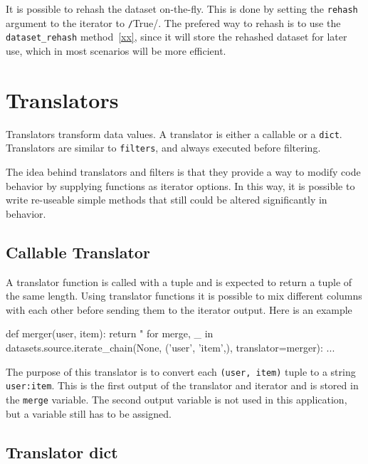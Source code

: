 It is possible to rehash the dataset on-the-fly.  This is done by
setting the \texttt{rehash} argument to the iterator to
\texttt/True/.  The prefered way to rehash is to use the
\texttt{dataset\_rehash} method~\ref{xx}, since it will store the
rehashed dataset for later use, which in most scenarios will be more
efficient.


\section{Translators}

Translators transform data values. A translator is either a callable or
a \texttt{dict}.  Translators are similar to \texttt{filters}, and
always executed before filtering.

The idea behind translators and filters is that they provide a way to
modify code behavior by supplying functions as iterator options.  In
this way, it is possible to write re-useable simple methods that still
could be altered significantly in behavior.



\subsection*{Callable Translator}

A translator function is called with a tuple and is expected to return
a tuple of the same length.  Using translator functions it is possible
to mix different columns with each other before sending them to the
iterator output.  Here is an example

\begin{python}
def merger(user, item):
    return "%
for merge, _ in datasets.source.iterate_chain(None, ('user', 'item',),
                                     translator=merger):
    ...
\end{python}
The purpose of this translator is to convert each
\texttt{(user, item)} tuple to a string \texttt{user:item}.  This is
the first output of the translator and iterator and is stored in the
\texttt{merge} variable.  The second output variable is not used in
this application, but a variable still has to be assigned.



\subsection*{Translator dict}


